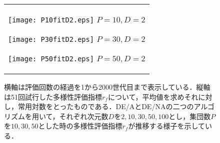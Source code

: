 \documentclass[a4paper,11pt,oneside,openany]{jsbook}
\begin{document}
\begin{figure}[htbp]
  \caption{横軸は評価回数の経過を1から2000世代目まで表示している．縦軸は51回試行した多様性評価指標$r_f$について，平均値を求めそれに対し，常用対数をとったものである．DE/AとDE/NAの二つのアルゴリズムを用いて，それぞれ次元数$D$を$2,10,30,50,100$とし，集団数$P$を$10,30,50$とした時の多様性評価指標$r_f$が推移する様子を示している．}
  \begin{center}
    \begin{tabular}{c}


      \begin{minipage}{0.33\hsize}
        \begin{center}
          \texttt{[image: P10fitD2.eps]}
          \hspace{1.2cm}$P=10, D=2
 $       \end{center}
      \end{minipage}

      \begin{minipage}{0.33\hsize}
        \begin{center}
          \texttt{[image: P30fitD2.eps]}
          \hspace{1.2cm}$P=30, D=2
 $       \end{center}
      \end{minipage}

      \begin{minipage}{0.33\hsize}
        \begin{center}
          \texttt{[image: P50fitD2.eps]}
          \hspace{1.2cm}$P=50, D=2
 $       \end{center}
      \end{minipage}
    \end{tabular}
  \end{center}
\end{figure}
\end{document}
